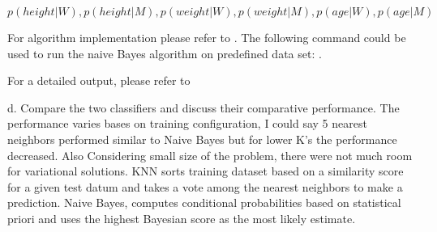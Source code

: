 \documentclass{homeworg}
\begin{document}
$$
p(height|W ), p(height|M ), p(weight|W ),
p(weight|M ), p(age|W ), p(age|M )
$$


For algorithm implementation please refer to \textbf{}.
The following command could be used to run the naive Bayes algorithm on predefined data
set:  \textbf{} \textbf{}.
\newline

For a detailed output, please refer to \textbf{}



d. Compare the two classifiers and discuss their comparative performance.
\newline
The performance varies bases on training configuration, I could say 5 nearest
neighbors performed similar to Naive Bayes but for lower K's the performance
decreased. Also Considering small size of the problem, there were not
much room for variational solutions. KNN sorts training dataset based on a similarity score
for a given test datum and takes a vote among the nearest neighbors to make a prediction.
Naive Bayes, computes conditional probabilities based on statistical priori and
uses the highest Bayesian score as the most likely estimate.
\end{document}
